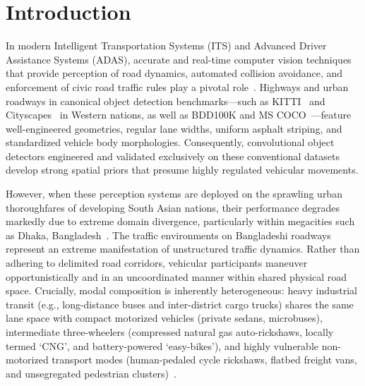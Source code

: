 \documentclass[pdflatex,sn-mathphys]{sn-jnl}
\begin{document}

\maketitle

\section{Introduction}\label{sec:intro}

In modern Intelligent Transportation Systems (ITS) and Advanced Driver Assistance Systems (ADAS), accurate and real-time computer vision techniques that provide perception of road dynamics, automated collision avoidance, and enforcement of civic road traffic rules play a pivotal role~\cite{geiger2012are,cordts2016cityscapes,redmon2016you,zhao2024detrs}. Highways and urban roadways in canonical object detection benchmarks---such as KITTI~\cite{geiger2012are} and Cityscapes~\cite{cordts2016cityscapes} in Western nations, as well as BDD100K and MS COCO~\cite{lin2014microsoft}---feature well-engineered geometries, regular lane widths, uniform asphalt striping, and standardized vehicle body morphologies. Consequently, convolutional object detectors engineered and validated exclusively on these conventional datasets develop strong spatial priors that presume highly regulated vehicular movements.

However, when these perception systems are deployed on the sprawling urban thoroughfares of developing South Asian nations, their performance degrades markedly due to extreme domain divergence, particularly within megacities such as Dhaka, Bangladesh~\cite{hasan2021bangladeshi,rahman2022fine,varma2019idd,hijbullah2026attention}. The traffic environments on Bangladeshi roadways represent an extreme manifestation of unstructured traffic dynamics. Rather than adhering to delimited road corridors, vehicular participants maneuver opportunistically and in an uncoordinated manner within shared physical road space. Crucially, modal composition is inherently heterogeneous: heavy industrial transit (e.g., long-distance buses and inter-district cargo trucks) shares the same lane space with compact motorized vehicles (private sedans, microbuses), intermediate three-wheelers (compressed natural gas auto-rickshaws, locally termed `CNG', and battery-powered `easy-bikes'), and highly vulnerable non-motorized transport modes (human-pedaled cycle rickshaws, flatbed freight vans, and unsegregated pedestrian clusters)~\cite{hossain2024visual,rahman2021densely}.
\end{document}
